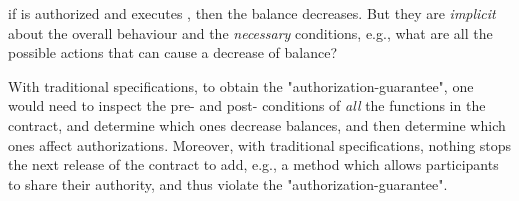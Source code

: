 if  is authorized and executes , then   the balance decreases. But they are {\em implicit} about the overall behaviour and the   {\em necessary} conditions,
e.g., what are all the possible actions that can cause a decrease of balance?

With traditional  specifications, to obtain the "authorization-guarantee", one would need to inspect the pre- and post- conditions of {\em all} the functions
in the contract, and determine which ones decrease balances, and then determine which ones affect authorizations.
Moreover, with traditional  specifications, nothing stops the next release of the contract to add, e.g., a method which
allows participants to share their authority, and thus
 violate the "authorization-guarantee".
 
\begin{figure}   
\end{figure}
